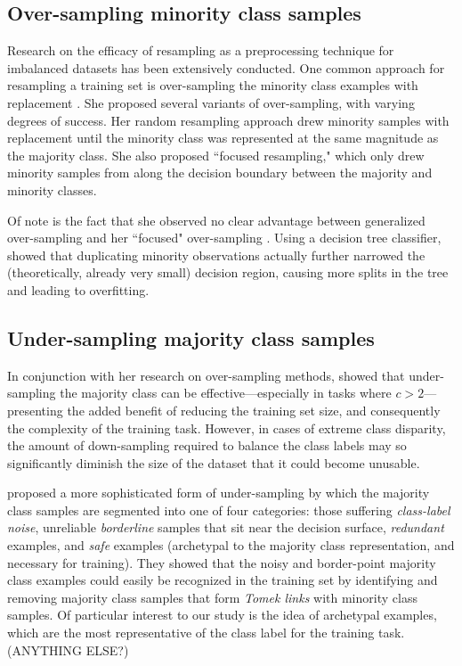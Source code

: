 \documentclass[twoside,11pt]{article}
\begin{document}
\subsection{Over-sampling minority class samples}

Research on the efficacy of resampling as a preprocessing technique for imbalanced datasets has been extensively conducted. One common approach for resampling a training set is over-sampling the minority class examples with replacement \citep{japkowicz2000class}. She proposed several variants of over-sampling, with varying degrees of success. Her random resampling approach drew minority samples with replacement until the minority class was represented at the same magnitude as the majority class. She also proposed ``focused resampling," which only drew minority samples from along the decision boundary between the majority and minority classes. 

Of note is the fact that she observed no clear advantage between generalized over-sampling and her ``focused" over-sampling \citep{japkowicz2000class}. Using a decision tree classifier, \citet{chawla2002smote} showed that duplicating minority observations actually further narrowed the (theoretically, already very small) decision region, causing more splits in the tree and leading to overfitting.


\subsection{Under-sampling majority class samples}

In conjunction with her research on over-sampling methods, \citet*{japkowicz2000learning} showed that under-sampling the majority class can be effective---especially in tasks where $c > 2$---presenting the added benefit of reducing the training set size, and consequently the complexity of the training task. However, in cases of extreme class disparity, the amount of down-sampling required to balance the class labels may so significantly diminish the size of the dataset that it could become unusable.

\citet*{kubat1997addressing} proposed a more sophisticated form of under-sampling by which the majority class samples are segmented into one of four categories: those suffering \emph{class-label noise}, unreliable \emph{borderline} samples that sit near the decision surface, \emph{redundant} examples, and \emph{safe} examples (archetypal to the majority class representation, and necessary for training). They showed that the noisy and border-point majority class examples could easily be recognized in the training set by identifying and removing majority class samples that form \emph{Tomek links} \citep{tomek1976two} with minority class samples. Of particular interest to our study is the idea of archetypal examples, which are the most representative of the class label for the training task. (ANYTHING ELSE?)
\end{document}
